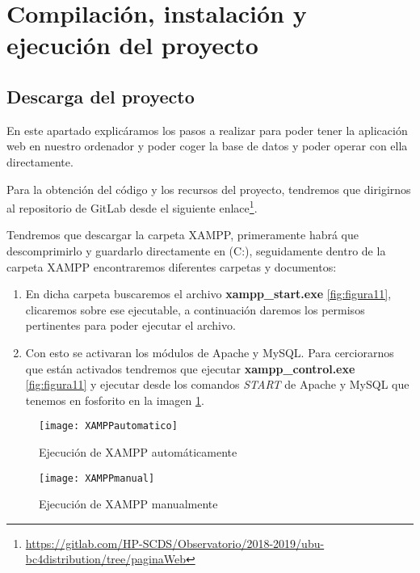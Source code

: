 \section{Compilación, instalación y ejecución del proyecto}\label{intalacionE}

\subsection{Descarga del proyecto}
En este apartado explicáramos los pasos a realizar para poder tener la aplicación web en nuestro ordenador y poder coger la base de datos y poder operar con ella directamente. 

Para la obtención del código y los recursos del proyecto, tendremos que dirigirnos al repositorio de GitLab desde el siguiente enlace\footnote{\url{https://gitlab.com/HP-SCDS/Observatorio/2018-2019/ubu-bc4distribution/tree/paginaWeb}}.

Tendremos que descargar la carpeta XAMPP, primeramente habrá que descomprimirlo y guardarlo directamente en (C:), seguidamente dentro de la carpeta XAMPP encontraremos diferentes carpetas y documentos:

\begin{enumerate}
	\item En dicha carpeta buscaremos el archivo \textbf{xampp\_start.exe} \ref{fig:figura11}, clicaremos sobre ese ejecutable, a continuación daremos los permisos pertinentes para poder ejecutar el archivo.
	\item Con esto se activaran los módulos de Apache y MySQL. Para cerciorarnos que están activados tendremos que ejecutar \textbf{xampp\_control.exe} \ref{fig:figura11} y ejecutar desde los comandos \textit{START} de Apache y MySQL que tenemos en fosforito en la imagen \ref{fig:figura12}.
\end{enumerate}

\begin{figure}[h!]
	\centering
	\begin{minipage}[b]{0.8\linewidth}
		\centering
		\texttt{[image: XAMPPautomatico]}
		\caption{Ejecución de XAMPP automáticamente}
		\label{fig:figura11}
	\end{minipage}
	\begin{minipage}[b]{0.8\linewidth}
		\centering
		\texttt{[image: XAMPPmanual]}
		\caption{Ejecución de XAMPP manualmente}
		\label{fig:figura12}
	\end{minipage}
\end{figure}


